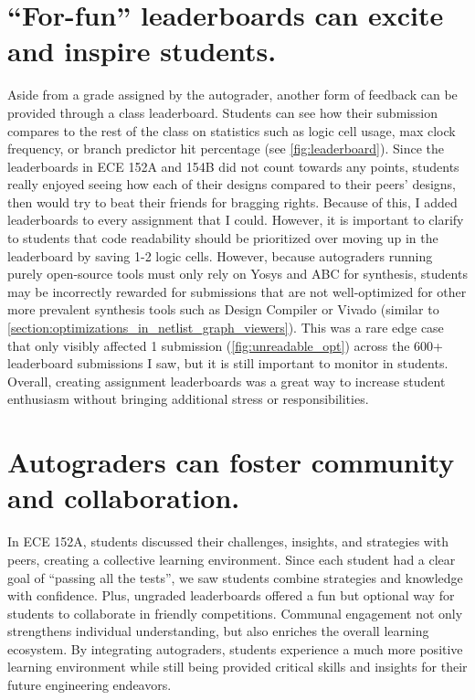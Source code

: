 \section{\enquote{For-fun} leaderboards can excite and inspire students.}
\label{section:leaderboard}




Aside from a grade assigned by the autograder, another form of feedback can be provided through a class leaderboard. Students can see how their submission compares to the rest of the class on statistics such as logic cell usage, max clock frequency, or branch predictor hit percentage (see \autoref{fig:leaderboard}). Since the leaderboards in ECE 152A and 154B did not count towards any points, students really enjoyed seeing how each of their designs compared to their peers' designs, then would try to beat their friends for bragging rights. Because of this, I added leaderboards to every assignment that I could. However, it is important to clarify to students that code readability should be prioritized over moving up in the leaderboard by saving 1-2 logic cells. However, because autograders running purely open-source tools must only rely on Yosys and ABC for synthesis, students may be incorrectly rewarded for submissions that are not well-optimized for other more prevalent synthesis tools such as Design Compiler or Vivado (similar to \autoref{section:optimizations_in_netlist_graph_viewers}). This was a rare edge case that only visibly affected 1 submission (\autoref{fig:unreadable_opt}) across the 600+ leaderboard submissions I saw, but it is still important to monitor in students. Overall, creating assignment leaderboards was a great way to increase student enthusiasm without bringing additional stress or responsibilities.

\section{Autograders can foster community and collaboration.}

In ECE 152A, students discussed their challenges, insights, and strategies with peers, creating a collective learning environment. Since each student had a clear goal of \enquote{passing all the tests}, we saw students combine strategies and knowledge with confidence. Plus, ungraded leaderboards offered a fun but optional way for students to collaborate in friendly competitions. Communal engagement not only strengthens individual understanding, but also enriches the overall learning ecosystem. By integrating autograders, students experience a much more positive learning environment while still being provided critical skills and insights for their future engineering endeavors.

